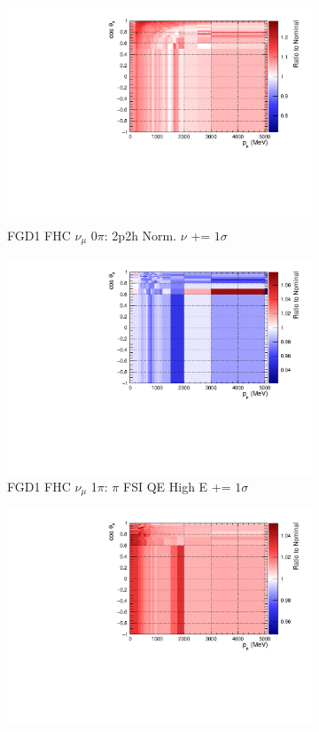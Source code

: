 \begin{figure}[!htbp]
\centering
\begin{subfigure}{.32\textwidth}
  \centering
  \includegraphics[width=0.85\linewidth]{figs/sig/FGD1_numuCC_0pi_2p2h_norm_nu_+1sig.pdf}
  \caption{FGD1 FHC $\nu_{\mu}$ 0$\pi$: 2p2h Norm. $\nu$ += $1\sigma$}
  \label{fig:sigvar_FGD1_numuCC_0pi}
\end{subfigure}
\begin{subfigure}{.32\textwidth}
  \centering
  \includegraphics[width=0.85\linewidth]{figs/sig/FGD1_numuCC_1pi_FEFQEH_+1sig.pdf}
  \caption{FGD1 FHC $\nu_{\mu}$ 1$\pi$: $\pi$ FSI QE High E += $1\sigma$}
  \label{fig:sigvar_FGD1_numuCC_1pi}
\end{subfigure}
\begin{subfigure}{.32\textwidth}
  \centering
  \includegraphics[width=0.85\linewidth]{figs/sig/FGD1_numuCC_other_CC_AGKY_Mult_+1sig.pdf}

\end{subfigure}
\end{figure}
